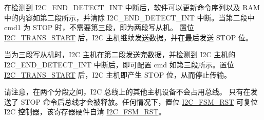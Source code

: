 \documentclass[main\_\_CN.tex]{subfiles}
\begin{document}
在检测到 I2C\_END\_DETECT\_INT 中断后，软件可以更新命令序列以及 RAM 中的内容如第二段所示，并清除 I2C\_END\_DETECT\_INT 中断。当第二段中 cmd1 为 STOP 时，不需要第三段，即为两段写从机。 置位 \hyperref[fielddesc:I2CTRANSSTART]{I2C\_TRANS\_START} 后，I2C 主机继续发送数据，并在最后发送 STOP 位。

当为三段写从机时，I2C 主机在第二段发送完数据，并检测到 I2C 主机的 I2C\_END\_DETECT\_INT 中断后，即可配置 cmd 如第三段所示。置位 \hyperref[fielddesc:I2CTRANSSTART]{I2C\_TRANS\_START} 后，I2C 主机即产生 STOP 位，从而停止传输。 

请注意，在两个分段之间，I2C 总线上的其他主机设备不会占用总线。 只有在发送了 STOP 命令后总线才会被释放。任何情况下，置位 \hyperref[fielddesc:I2CFSMRST]{I2C\_FSM\_RST} 可复位 I2C 控制器，该寄存器硬件自清 \hyperref[fielddesc:I2CFSMRST]{I2C\_FSM\_RST}。
\end{document}
